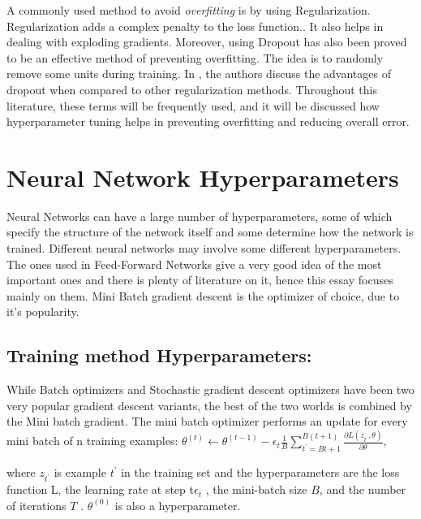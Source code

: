 \documentclass[twoside]{article}
\begin{document}
A commonly used method to avoid \textit{overfitting} is by using Regularization. Regularization adds a complex penalty to the loss function.\cite{girosi1995regularization}. It also helps in dealing with exploding gradients. Moreover, using Dropout has also been proved to be an effective method of preventing overfitting. The idea is to randomly remove some units during training. In \cite{srivastava2014dropout}, the authors discuss the advantages of dropout when compared to other regularization methods.
Throughout this literature, these terms will be frequently used, and it will be discussed how hyperparameter tuning helps in preventing overfitting and reducing overall error.


\section{Neural Network Hyperparameters}

Neural Networks can have a large number of  hyperparameters, some of which specify the structure of the network itself and some determine how the network is trained. Different neural networks may involve some different hyperparameters. The ones used in Feed-Forward Networks give a very good idea of the most important ones and there is plenty of literature on it, hence this essay focuses mainly on them. Mini Batch gradient descent is the optimizer of choice, due to it's popularity.



\subsection{ Training method Hyperparameters:}
While Batch optimizers and Stochastic gradient descent optimizers have been two very popular gradient descent variants, the best of the two worlds is combined by the Mini batch gradient. The mini batch optimizer performs an update for every mini batch of n training examples:\newline
$\theta^{(t)} \leftarrow \theta^{(t - 1)} - \epsilon_t \frac{1}{B} \sum_{t^\prime = Bt + 1}^{B(t + 1)} \frac{\partial L(z_{t^\prime}, \theta)}{\partial\theta}$, 

where $z_{t^\prime}$  is example $t^\prime$ in the training set and the hyperparameters are the loss function L, the learning rate at step t$\epsilon_t$ , the mini-batch size $B$, and the number of iterations $T$ . $\theta^{(0)}$ is also a hyperparameter.
\end{document}
